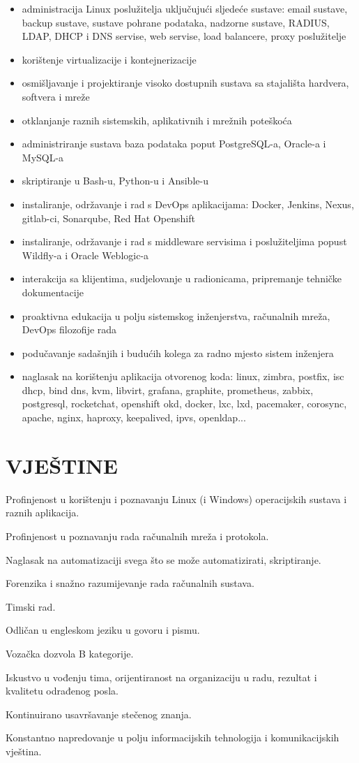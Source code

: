 \documentclass{cv}
\begin{document}
\begin{itemize}
    \setlength\itemsep{0.1cm}
    \item administracija Linux poslužitelja uključujući sljedeće sustave: email sustave, backup sustave, sustave pohrane podataka, nadzorne sustave, RADIUS, LDAP, DHCP i DNS servise, web servise, load balancere, proxy poslužitelje
    \item korištenje virtualizacije i kontejnerizacije
    \item osmišljavanje i projektiranje visoko dostupnih sustava sa stajališta hardvera, softvera i mreže
    \item otklanjanje raznih sistemskih, aplikativnih i mrežnih poteškoća
    \item administriranje sustava baza podataka poput PostgreSQL-a, Oracle-a i MySQL-a
    \item skriptiranje u Bash-u, Python-u i Ansible-u 
    \item instaliranje, održavanje i rad s DevOps aplikacijama: Docker, Jenkins, Nexus, gitlab-ci, Sonarqube, Red Hat Openshift
    \item instaliranje, održavanje i rad s middleware servisima i poslužiteljima popust Wildfly-a i Oracle Weblogic-a
    \item interakcija sa klijentima, sudjelovanje u radionicama, pripremanje tehničke dokumentacije
    \item proaktivna edukacija u polju sistemskog inženjerstva, računalnih mreža, DevOps filozofije rada
    \item podučavanje sadašnjih i budućih kolega za radno mjesto sistem inženjera
    \item naglasak na korištenju aplikacija otvorenog koda: linux, zimbra, postfix, isc dhcp, bind dns, kvm, libvirt, grafana, graphite, prometheus, zabbix, postgresql, rocketchat, openshift okd, docker, lxc, lxd, pacemaker, corosync, apache, nginx, haproxy, keepalived, ipvs, openldap...
\end{itemize}
\section{VJEŠTINE}
Profinjenost u korištenju i poznavanju Linux (i Windows) operacijskih sustava i raznih aplikacija.

Profinjenost u poznavanju rada računalnih mreža i protokola.

Naglasak na automatizaciji svega što se može automatizirati, skriptiranje.

Forenzika i snažno razumijevanje rada računalnih sustava.

Timski rad.

Odličan u engleskom jeziku u govoru i pismu.

Vozačka dozvola B kategorije.

Iskustvo u vođenju tima, orijentiranost na organizaciju u radu, rezultat i kvalitetu odrađenog posla.

Kontinuirano usavršavanje stečenog znanja.

Konstantno napredovanje u polju informacijskih tehnologija i komunikacijskih vještina.
\end{document}

